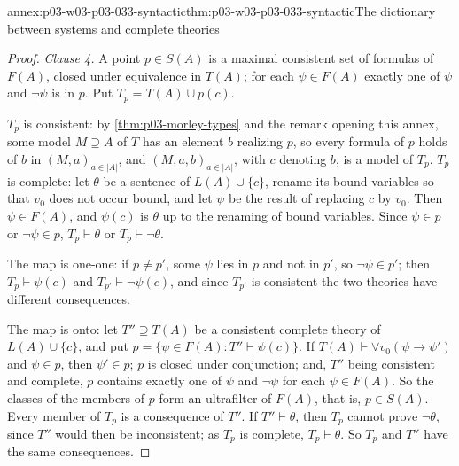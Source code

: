 \begin{annexitem}{annex:p03-w03-p03-033-syntactic}{thm:p03-w03-p03-033-syntactic}{The dictionary between systems and complete theories}
\begin{proof}
\emph{Clause 4.} A point \(p\in S(A)\) is a maximal consistent set of
formulas of \(F(A)\), closed under equivalence in \(T(A)\); for each
\(\psi\in F(A)\) exactly one of \(\psi\) and \(\neg\psi\) is in \(p\).
Put \(T_p=T(A)\cup p(c)\).

\(T_p\) is consistent: by \cref{thm:p03-morley-types} and the remark
opening this annex, some model \(M\supseteq A\) of \(T\) has an element
\(b\) realizing \(p\), so every formula of \(p\) holds of \(b\) in
\((M,a)_{a\in|A|}\), and \((M,a,b)_{a\in|A|}\), with \(c\) denoting \(b\),
is a model of \(T_p\). \(T_p\) is complete: let \(\theta\) be a sentence
of \(L(A)\cup\{c\}\), rename its bound variables so that \(v_0\) does not
occur bound, and let \(\psi\) be the result of replacing \(c\) by
\(v_0\). Then \(\psi\in F(A)\), and \(\psi(c)\) is \(\theta\) up to the
renaming of bound variables. Since \(\psi\in p\) or \(\neg\psi\in p\),
\(T_p\vdash\theta\) or \(T_p\vdash\neg\theta\).

The map is one-one: if \(p\neq p'\), some \(\psi\) lies in \(p\) and not
in \(p'\), so \(\neg\psi\in p'\); then \(T_p\vdash\psi(c)\) and
\(T_{p'}\vdash\neg\psi(c)\), and since \(T_{p'}\) is consistent the two
theories have different consequences.

The map is onto: let \(T''\supseteq T(A)\) be a consistent complete theory
of \(L(A)\cup\{c\}\), and put \(p=\{\psi\in F(A):T''\vdash\psi(c)\}\). If
\(T(A)\vdash\forall v_0(\psi\to\psi')\) and \(\psi\in p\), then
\(\psi'\in p\); \(p\) is closed under conjunction; and, \(T''\) being
consistent and complete, \(p\) contains exactly one of \(\psi\) and
\(\neg\psi\) for each \(\psi\in F(A)\). So the classes of the members of
\(p\) form an ultrafilter of \(F(A)\), that is, \(p\in S(A)\). Every
member of \(T_p\) is a consequence of \(T''\). If \(T''\vdash\theta\),
then \(T_p\) cannot prove \(\neg\theta\), since \(T''\) would then be
inconsistent; as \(T_p\) is complete, \(T_p\vdash\theta\). So \(T_p\) and
\(T''\) have the same consequences.
\end{proof}
\end{annexitem}

